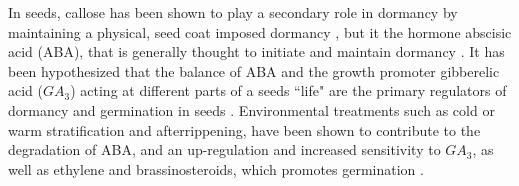\documentclass[12pt]{article}\usepackage[]{graphicx}\usepackage[]{color}
\begin{document}
\par In seeds, callose has been shown to play a secondary role in dormancy by maintaining a physical, seed coat imposed dormancy \citep{Leubner2003}, but it the hormone abscisic acid (ABA), that is generally thought to initiate and maintain dormancy \citep{Baskin2014, Fenner2000}. It has been hypothesized that the balance of ABA and the growth promoter gibberelic acid ($GA_3$) acting at different parts of a seeds ``life" are the primary regulators of dormancy and germination in seeds \citep{Leubner2003,Kucera2005}. Environmental treatments such as cold or warm stratification and afterrippening, have been shown to contribute to the degradation of ABA, and an up-regulation and increased sensitivity to $GA_3$, as well as ethylene and brassinosteroids, which promotes germination \citep{Kucera2005}.
\end{document}

